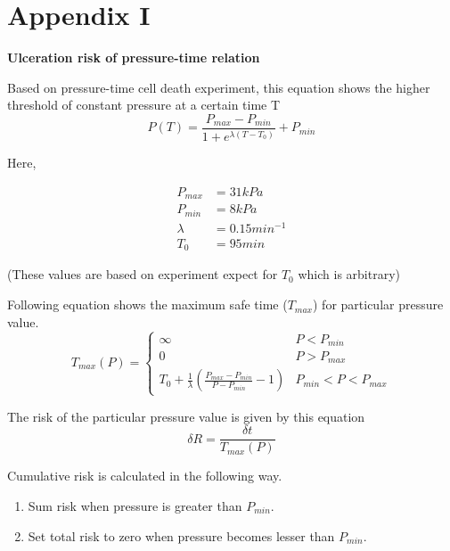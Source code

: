 \chapter*{Appendix I}
\label{chapter:appendix1}

\textbf{Ulceration risk of pressure-time relation}

Based on pressure-time cell death experiment, this equation shows the higher threshold of constant pressure at a certain time T
\begin{equation}
    P(T) = \frac{P_{max}-P_{min}}{1 + e^{\lambda(T-T_0)}} + P_{min}
\end{equation}

Here,

\begin{align*}
    P_{max} &= 31 kPa\\
    P_{min} &= 8 kPa\\
    \lambda &= 0.15 min^{-1}\\
    T_0     &= 95 min
\end{align*}

(These values are based on experiment expect for $T_0$ which is arbitrary)

Following equation shows the maximum safe time ($T_{max}$) for particular pressure value.  
\begin{equation}
    T_{max}(P) = 
    \begin{cases}
        \infty & P < P_{min}\\
        0  & P > P_{max}\\
        T_0 + \frac{1}{\lambda}\left( \frac{P_{max}-P_{min}}{P-P_{min}} - 1 \right) & P_{min} < P < P_{max}
    \end{cases}
\end{equation}

The risk of the particular pressure value is given by this equation
\begin{equation}
    \delta R = \frac{\delta t}{T_{max}(P)}
\end{equation}

Cumulative risk is calculated in the following way.

\begin{enumerate}
    \item Sum risk when pressure is greater than $P_{min}$.
    \item Set total risk to zero when pressure becomes lesser than $P_{min}$.
\end{enumerate}


